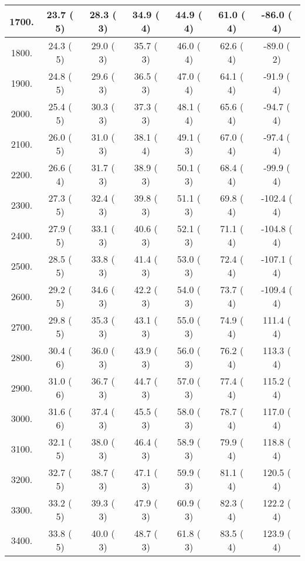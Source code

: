 \begin{tabular}{|c||c|c|c|c|c|c|}
\hline
 1700. &    23.7 (      5) &    28.3 (      3) &    34.9 (      4) &    44.9 (      4) &    61.0 (      4) &   -86.0 (      4)\tabularnewline
\hline
 1800. &    24.3 (      5) &    29.0 (      3) &    35.7 (      3) &    46.0 (      4) &    62.6 (      4) &   -89.0 (      2)\tabularnewline
\hline
 1900. &    24.8 (      5) &    29.6 (      3) &    36.5 (      3) &    47.0 (      4) &    64.1 (      4) &   -91.9 (      4)\tabularnewline
\hline
 2000. &    25.4 (      5) &    30.3 (      3) &    37.3 (      3) &    48.1 (      4) &    65.6 (      4) &   -94.7 (      4)\tabularnewline
\hline
 2100. &    26.0 (      5) &    31.0 (      3) &    38.1 (      4) &    49.1 (      3) &    67.0 (      4) &   -97.4 (      4)\tabularnewline
\hline
 2200. &    26.6 (      4) &    31.7 (      3) &    38.9 (      3) &    50.1 (      3) &    68.4 (      4) &   -99.9 (      4)\tabularnewline
\hline
 2300. &    27.3 (      5) &    32.4 (      3) &    39.8 (      3) &    51.1 (      3) &    69.8 (      4) &  -102.4 (      4)\tabularnewline
\hline
 2400. &    27.9 (      5) &    33.1 (      3) &    40.6 (      3) &    52.1 (      3) &    71.1 (      4) &  -104.8 (      4)\tabularnewline
\hline
 2500. &    28.5 (      5) &    33.8 (      3) &    41.4 (      3) &    53.0 (      3) &    72.4 (      4) &  -107.1 (      4)\tabularnewline
\hline
 2600. &    29.2 (      5) &    34.6 (      3) &    42.2 (      3) &    54.0 (      3) &    73.7 (      4) &  -109.4 (      4)\tabularnewline
\hline
 2700. &    29.8 (      5) &    35.3 (      3) &    43.1 (      3) &    55.0 (      3) &    74.9 (      4) &   111.4 (      4)\tabularnewline
\hline
 2800. &    30.4 (      6) &    36.0 (      3) &    43.9 (      3) &    56.0 (      3) &    76.2 (      4) &   113.3 (      4)\tabularnewline
\hline
 2900. &    31.0 (      6) &    36.7 (      3) &    44.7 (      3) &    57.0 (      3) &    77.4 (      4) &   115.2 (      4)\tabularnewline
\hline
 3000. &    31.6 (      6) &    37.4 (      3) &    45.5 (      3) &    58.0 (      3) &    78.7 (      4) &   117.0 (      4)\tabularnewline
\hline
 3100. &    32.1 (      5) &    38.0 (      3) &    46.4 (      3) &    58.9 (      3) &    79.9 (      4) &   118.8 (      4)\tabularnewline
\hline
 3200. &    32.7 (      5) &    38.7 (      3) &    47.1 (      3) &    59.9 (      3) &    81.1 (      4) &   120.5 (      4)\tabularnewline
\hline
 3300. &    33.2 (      5) &    39.3 (      3) &    47.9 (      3) &    60.9 (      3) &    82.3 (      4) &   122.2 (      4)\tabularnewline
\hline
 3400. &    33.8 (      5) &    40.0 (      3) &    48.7 (      3) &    61.8 (      3) &    83.5 (      4) &   123.9 (      4)\tabularnewline

\end{tabular}
